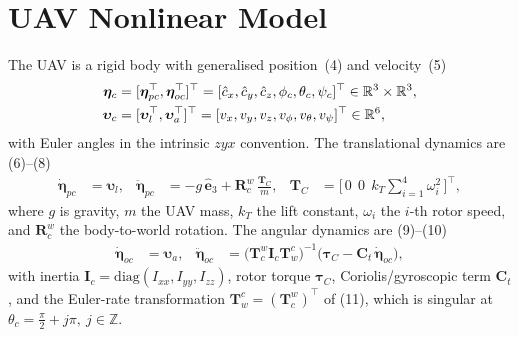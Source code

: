 \documentclass[12pt,a4paper]{report}
\begin{document}
\section{UAV Nonlinear Model}
The UAV is a rigid body with generalised position~(4) and velocity~(5)
\begin{align}
\bm{\eta}_c &= [\bm{\eta}_{pc}^\top,\bm{\eta}_{oc}^\top]^\top = [\hat{c}_x,\hat{c}_y,\hat{c}_z,\phi_c,\theta_c,\psi_c]^\top \in \mathbb{R}^{3}\times\mathbb{R}^{3},\\
\bm{\upsilon}_c &= [\bm{\upsilon}_l^\top,\bm{\upsilon}_a^\top]^\top = [v_x,v_y,v_z,v_\phi,v_\theta,v_\psi]^\top \in \mathbb{R}^{6},
\end{align}
with Euler angles in the intrinsic $zyx$ convention. The translational dynamics are (6)--(8)
\begin{align}
\dot{\bm{\eta}}_{pc} &= \bm{\upsilon}_l, &
\ddot{\bm{\eta}}_{pc} &= -g\,\hat{\bm{e}}_3 + \bm{R}^{w}_{c}\,\frac{\bm{T}_C}{m}, &
\bm{T}_C &= \Big[\,0\ \ 0\ \ k_T\textstyle\sum_{i=1}^{4}\omega_i^2\,\Big]^\top,
\end{align}
where $g$ is gravity, $m$ the UAV mass, $k_T$ the lift constant, $\omega_i$ the $i$-th rotor speed, and $\bm{R}^{w}_{c}$ the body-to-world rotation. The angular dynamics are (9)--(10)
\begin{align}
\dot{\bm{\eta}}_{oc} &= \bm{\upsilon}_a, &
\ddot{\bm{\eta}}_{oc} &= \big(\bm{T}^{w}_{c}\bm{I}_{c}\bm{T}^{c}_{w}\big)^{-1}\big(\bm{\tau}_C - \bm{C}_t\,\dot{\bm{\eta}}_{oc}\big),
\end{align}
with inertia $\bm{I}_c=\mathrm{diag}(I_{xx},I_{yy},I_{zz})$, rotor torque $\bm{\tau}_C$, Coriolis/gyroscopic term $\bm{C}_t$, and the Euler-rate transformation $\bm{T}^{c}_{w}=(\bm{T}^{w}_{c})^\top$ of (11), which is singular at $\theta_c=\tfrac{\pi}{2}+j\pi,\ j\in\mathbb{Z}$.
\end{document}
